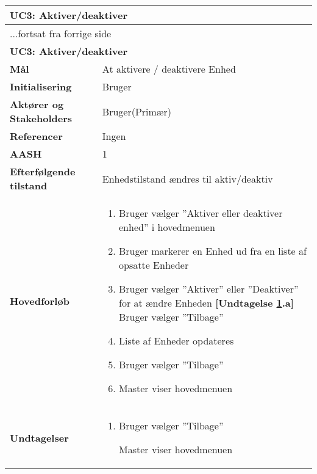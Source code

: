\begin{center} \centering \label{UC3} 
	\begin{longtable}{|p{5cm}|p{9cm}|}  %
	\hline
		\multicolumn{2}{|l|}{\textbf{UC3: Aktiver/deaktiver}} \\\hline %
		\endfirsthead
		
		\multicolumn{2}{l}{...fortsat fra forrige side} \\ \hline %
		\multicolumn{2}{|l|}{\textbf{UC3: Aktiver/deaktiver}} \\\hline %
		\endhead	
		
		\textbf{Mål}								&At aktivere / deaktivere Enhed	\\\hline
		\textbf{Initialisering}					&Bruger				\\\hline
		\textbf{Aktører og Stakeholders}			&Bruger(Primær)		\\\hline
		\textbf{Referencer}						&Ingen				\\\hline
		\textbf{AASH}							&1					\\\hline
		\textbf{Efterfølgende tilstand}			&Enhedstilstand ændres til aktiv/deaktiv\\\hline
		\textbf{Hovedforløb}					
			&\begin{enumerate}
	
	
				\item Bruger vælger ''Aktiver eller deaktiver enhed'' i hovedmenuen
				
				\item Bruger markerer en Enhed ud fra en liste af opsatte Enheder
				
				\item \label{uc3aktiver} Bruger vælger ''Aktiver'' eller ''Deaktiver'' for at ændre Enheden\newline
				\textbf{[Undtagelse \ref{uc3aktiver}.a]} \newline
				Bruger vælger ''Tilbage''
				
				\item Liste af Enheder opdateres		
			
				\item Bruger vælger ''Tilbage''
				
				\item Master viser hovedmenuen	
	
			\end{enumerate}\\\hline
			
		\textbf{Undtagelser}
			&\begin{enumerate}[label=\ref{uc3aktiver}.a]
				
				\item Bruger vælger ''Tilbage''
				
					\subitem Master viser hovedmenuen
			\end{enumerate}\\\hline			
			
	\end{longtable}
\end{center}

